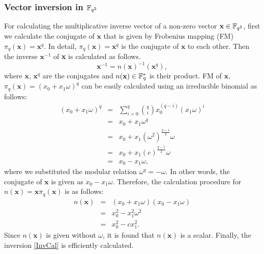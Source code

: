 \subsubsection{Vector inversion in ${\mathbb{F}}_{q^{2}}$}
For calculating the multiplicative inverse vector of a non-zero vector $\textbf{x}\in {\mathbb{F}}_{q^{2}}$, first we calculate the conjugate of $\textbf{x}$ that is given by  Frobenius mapping (FM)
$\pi_q(\textbf{x}) = \textbf{x}^q$. In detail, $\pi_q(\textbf{x})=\textbf{x}^q$ is the conjugate of $\textbf{x}$ to each other. Then the inverse $\textbf{x}^{-1}$ of \textbf{x} is calculated as follows.
\begin{equation}
\textbf{x}^{-1} = n(\textbf{x})^{-1}(\textbf{x}^q), \label{InvCal}
\end{equation}
where  $\textbf{x}$, $\textbf{x}^q$ are the conjugates and $n(\textbf{x}) \in {{\mathbb{F}}^{\ast}}_{\!\!\!q}$ is their
product. FM of $\textbf{x}$, $\pi_q(\textbf{x}) =  (x_0+x_1\omega)^q$ can be easily calculated using an irreducible binomial as follows:
\begin{eqnarray}\label{eq:FM}
(x_0+x_1\omega)^q & = & \sum_{i=0}^{q} {q\choose i} x_0^{(q-i)}(x_1\omega)^i \nonumber\\
& = & x_0 + x_1\omega^q  \nonumber \\
& = & x_0+x_1(\omega^2)^{\frac{q-1}{2}}\omega \nonumber \\ 
& = & x_0+x_1(c)^{\frac{q-1}{2}}\omega \nonumber \\
& = & x_0-x_1\omega,
\end{eqnarray}
where we substituted the modular relation $\omega^q = - \omega $. In other words, the conjugate of $\textbf{x}$ is given as $x_0 - x_1\omega$. Therefore, the calculation procedure for $n(\textbf{x}) = \textbf{x}\pi_q(\textbf{x})$ is as follows:
\begin{eqnarray}\label{eq:Inversion}
n(\textbf{x}) & = & (x_0+x_1\omega)(x_0 -x_1\omega)\nonumber\\
& = & x_0^2 - x_1^2\omega^2 \nonumber \\ 
& = & x_0^2 - cx_1^2.
\end{eqnarray}
Since $n(\textbf{x})$ is given without $\omega$, it is found that $n(\textbf{x})$ is a scalar. Finally, the inversion \eqref{InvCal} is efficiently calculated.


